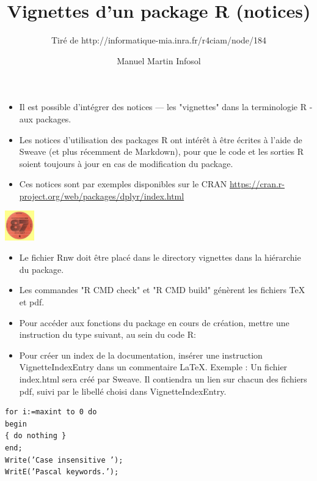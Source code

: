 \documentclass[12pt,handout]{beamer}
\author{Manuel Martin Infosol}
\title{Vignettes d'un package R (notices)}
\subtitle{Tiré de http://informatique-mia.inra.fr/r4ciam/node/184}
\begin{document}
\begin{frame}
\titlepage
\end{frame}


\begin{frame}[fragile]
\begin{itemize}
\item Il est possible d'intégrer des notices — les "vignettes" dans la terminologie R - aux packages.
\item Les notices d’utilisation des packages R ont intérêt
à être écrites à l'aide de Sweave (et plus récemment de Markdown),
pour que le code et les sorties R soient toujours à jour en cas de modification du package.
\item Ces notices sont par exemples disponibles sur le CRAN \url{https://cran.r-project.org/web/packages/dplyr/index.html}
\end{itemize}
\includegraphics[width = 36pt]{../images/vigtnette.jpg}
\end{frame}


\begin{frame}
\begin{itemize}
\item Le fichier Rnw doit être placé dans le directory vignettes dans la hiérarchie du package.
\item Les commandes "R CMD check" et "R CMD build" génèrent les fichiers TeX et pdf.
\item Pour accéder aux fonctions du package en cours de création, mettre une instruction du type suivant, au sein du code R:
 
\item Pour créer un index de la documentation, insérer une instruction \\VignetteIndexEntry dans un commentaire LaTeX. Exemple :
Un fichier index.html sera créé par Sweave.
Il contiendra un lien sur chacun des fichiers pdf, suivi par le libellé choisi dans VignetteIndexEntry.
\end{itemize}

\end{frame}

\begin{frame}[fragile]
\lstset{numbers=left, numberstyle=\tiny, stepnumber=2, numbersep=5pt}
	\begin{lstlisting}
for i:=maxint to 0 do
begin
{ do nothing }
end;
Write(’Case insensitive ’);
WritE(’Pascal keywords.’);
\end{lstlisting}

\end{frame}
\end{document}
